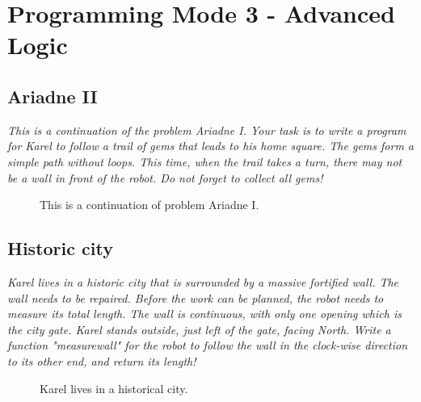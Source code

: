 \section{Programming Mode 3 - Advanced Logic}

\subsection{Ariadne II}

{\em This is a continuation of the problem Ariadne I. Your task is to write a program for Karel to follow a trail of gems that leads to his home square. The gems form a simple path without loops. This time, when the trail takes a turn, there may not be a wall in front of the robot. Do not forget to collect all gems!}

\begin{figure}[!ht]
\begin{center}
\vspace{6cm}
\end{center}
\vspace{-4mm}
\caption{This is a continuation of problem Ariadne I.}
\label{fig:g10b}
\end{figure}

\newpage

\subsection{Historic city}

{\em Karel lives in a historic city that is surrounded by a massive fortified wall. The wall needs to be repaired. Before the work can be planned, the robot needs to measure its total length. The wall is continuous, with only one opening which is the city gate. Karel stands outside, just left of the gate, facing North. Write a function "measurewall" for the robot to follow the wall in the clock-wise direction to its other end, and return its length!  }

\begin{figure}[!ht]
\begin{center}
\vspace{6cm}
\end{center}
\vspace{-4mm}
\caption{Karel lives in a historical city.}
\label{fig:g10c}
\end{figure}

